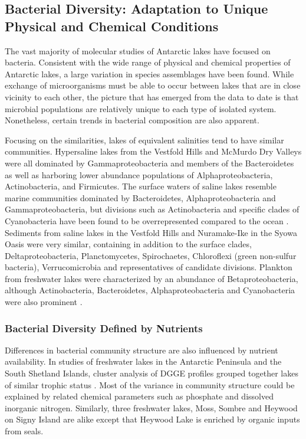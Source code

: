 \subsection{Bacterial Diversity: Adaptation to Unique Physical and Chemical Conditions}
The vast majority of molecular studies of Antarctic lakes have focused on bacteria.
Consistent with the wide range of physical and chemical properties of Antarctic lakes, a large variation in species assemblages have been found.
While exchange of microorganisms must be able to occur between lakes that are in close vicinity to each other, 
the picture that has emerged from the data to date is that microbial populations are relatively unique to each type of isolated system. 
Nonetheless, certain trends in bacterial composition are also apparent.

Focusing on the similarities, lakes of equivalent salinities tend to have similar communities.
Hypersaline lakes from the Vestfold Hills \cite{Bowman2000b} and McMurdo Dry Valleys \cite{Glatz2006, Mosier2007} were all dominated by Gammaproteobacteria and members of the Bacteroidetes
 as well as harboring lower abundance populations of Alphaproteobacteria, Actinobacteria, and Firmicutes.
The surface waters of saline lakes resemble marine communities dominated by Bacteroidetes, Alphaproteobacteria and Gammaproteobacteria,
 but divisions such as Actinobacteria and specific clades of Cyanobacteria have been found to be overrepresented compared to the ocean \cite{Lauro2011}.
Sediments from saline lakes in the Vestfold Hills \cite{Bowman2000a} and Nuramake-Ike in the Syowa Oasis \cite{Kurasawa2010} were very similar, 
containing in addition to the surface clades, Deltaproteobacteria, Planctomycetes, Spirochaetes, Chloroflexi (green non-sulfur bacteria), Verrucomicrobia and representatives of candidate divisions.
Plankton from freshwater lakes were characterized by an abundance of Betaproteobacteria, 
although Actinobacteria, Bacteroidetes, Alphaproteobacteria and Cyanobacteria were also prominent \cite{Pearce2003, Pearce2005, Pearce2005, Schiaffino2009}. 

\subsubsection{Bacterial Diversity Defined by Nutrients}
Differences in bacterial community structure are also influenced by nutrient availability.
In studies of freshwater lakes in the Antarctic Peninsula and the South Shetland Islands, cluster analysis of DGGE profiles grouped together lakes of similar trophic status 
\cite{Schiaffino2009, Villaescusa2010}.
Most of the variance in community structure could be explained by related chemical parameters such as phosphate and dissolved inorganic nitrogen.
Similarly, three freshwater lakes, Moss, Sombre and Heywood on Signy Island are alike except that Heywood Lake is enriched by organic inputs from seals.

